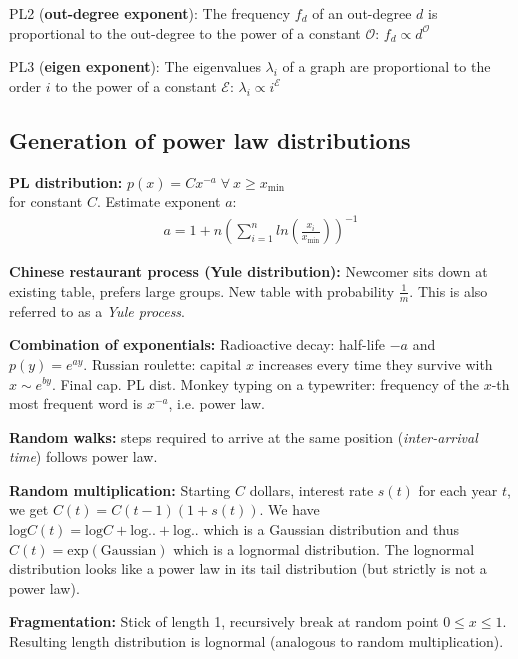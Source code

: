 PL2 (\textbf{out-degree exponent}): The frequency $f_d$ of an out-degree $d$ is proportional to the out-degree to the power of a constant $\mathcal{O}$: $f_d \propto d^\mathcal{O}$

PL3 (\textbf{eigen exponent}): The eigenvalues $\lambda_i$ of a graph are proportional to the order $i$ to the power of a constant $\mathcal{E}$: $\lambda_i \propto i^\mathcal{E}$

\subsection*{Generation of power law distributions}
\textbf{PL distribution:} $p(x) = Cx^{-a} \; \forall \ x \geq x_{\text{min}}$\\
for constant $C$. Estimate exponent $a$:
\begin{align*}
    a = 1 + n \left( \sum_{i=1}^n ln \left( \frac{x_i}{x_\text{min}} \right) \right)^{-1}
\end{align*}

\textbf{Chinese restaurant process (Yule distribution):} Newcomer sits down at existing table, prefers large groups. New table with probability $\frac{1}{m}$. This is also referred to as a \emph{Yule process}.

\textbf{Combination of exponentials:} Radioactive decay: half-life $-a$ and $p(y) = e^{ay}$. Russian roulette: capital $x$ increases every time they survive with $x \sim e^{by}$. Final cap. PL dist. Monkey typing on a typewriter: frequency of the $x$-th most frequent word is $x^{-a}$, i.e. power law.

\textbf{Random walks:} steps required to arrive at the same position (\emph{inter-arrival time}) follows power law.

\textbf{Random multiplication:} Starting $C$ dollars, interest rate $s(t)$ for each year $t$, we get $C(t) = C(t-1) (1+s(t))$. We have $\text{log} C(t) = \text{log} C + \text{log} .. + \text{log} ..$ which is a Gaussian distribution and thus $C(t) = \text{exp}(\text{Gaussian})$ which is a lognormal distribution. The lognormal distribution looks like a power law in its tail distribution (but strictly is not a power law).

\textbf{Fragmentation:} Stick of length 1, recursively break at random point $0 \leq x \leq 1$. Resulting length distribution is lognormal (analogous to random multiplication).